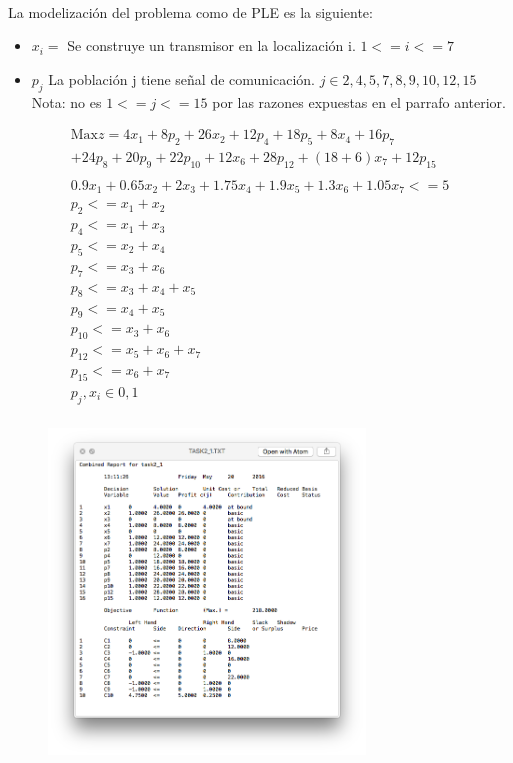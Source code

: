 \documentclass[10pt, a4paper]{article}
\begin{document}
			\paragraph{}
			La modelización del problema como de PLE es la siguiente:

			\begin{itemize}
				\item \(x_{i} = \) Se construye un transmisor en la localización i. $1<= i <= 7$

				\item \(p_{j} \) La población j tiene señal de comunicación. $j \in {2,4,5,7,8,9,10,12,15}$ Nota: no es  $1<= j <= 15$ por las razones expuestas en el parrafo anterior.
			\end{itemize}

			\[
				\begin{split}
					\text{Max} z = 4x_{1} + 8p_{2} + 26x_{2} + 12p_{4} +18p_{5} + 8x_{4} + 16p_{7} \\
						+ 24p_{8} +20p_{9} + 22p_{10}  +  12x_{6} + 28p_{12} + (18+6)x_{7} + 12p_{15} \\ \\
						0.9x_1 + 0.65x_2 + 2x_3 + 1.75x_4 + 1.9x_5 + 1.3x_6 + 1.05 x_7 <= 5 \\
						p_2 <= x_1 + x_2\\
						p_4 <= x_1 + x_3\\
						p_5 <= x_2 + x_4\\
						p_7 <= x_3 + x_6\\
						p_8 <= x_3 + x_4 + x_5\\
						p_9 <= x_4 + x_5\\
						p_{10} <= x_3 + x_6\\
						p_{12} <= x_5 + x_6 + x_7\\
						p_{15} <= x_6 + x_7\\
						p_{j}, x_{i} \in {0,1}\\
				\end{split}
			\]
			\begin{figure}[H]
			\centering
	            \includegraphics[width=0.75\textwidth]{res/exercise-1-result.png}
	        \end{figure}
\end{document}
